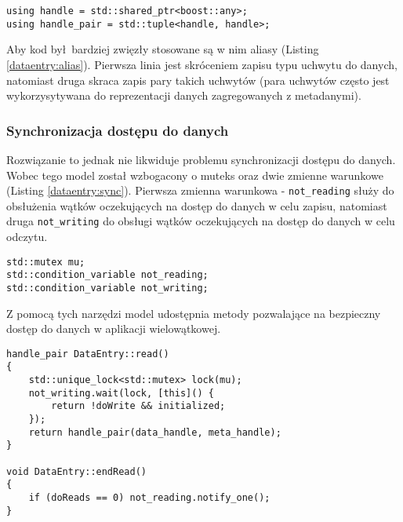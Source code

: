 \begin{minipage}{\textwidth}
	\begin{lstlisting}[label=dataentry:alias, caption={Aliasy używane w kodzie aplikacji},alsoletter={()[].=}]
using handle = std::shared_ptr<boost::any>;
using handle_pair = std::tuple<handle, handle>;
	\end{lstlisting}
\end{minipage}

Aby kod był bardziej zwięzły stosowane są w nim aliasy (Listing \ref{dataentry:alias}). Pierwsza linia jest skróceniem zapisu typu uchwytu do danych, natomiast druga skraca zapis pary takich uchwytów (para uchwytów często jest wykorzysytywana do reprezentacji danych zagregowanych z metadanymi).

\subsubsection{Synchronizacja dostępu do danych}
Rozwiązanie to jednak nie likwiduje problemu synchronizacji dostępu do danych. Wobec tego model został wzbogacony o muteks oraz dwie zmienne warunkowe (Listing \ref{dataentry:sync}). Pierwsza zmienna warunkowa - \lstinline$not_reading$ służy do obsłużenia wątków oczekujących na dostęp do danych w celu zapisu, natomiast druga \lstinline$not_writing$ do obsługi wątków oczekujących na dostęp do danych w celu odczytu.

\begin{minipage}{\textwidth}
	\begin{lstlisting}[label=dataentry:sync, caption={Składowe klasy \lstinline$DataEntry$ zapewniające bezpieczne użycie w środowisku wielowątkowym},alsoletter={()[].=}]
std::mutex mu;
std::condition_variable not_reading;
std::condition_variable not_writing;
	\end{lstlisting}
\end{minipage}

Z pomocą tych narzędzi model udostępnia metody pozwalające na bezpieczny dostęp do danych w aplikacji wielowątkowej.

\begin{minipage}{\textwidth}
	\begin{lstlisting}[label=dataentry:sync:read, caption={Metody klasy \lstinline$DataEntry$ zapewniające bezpieczny odczyt danych współdzielonych w środowisku wielowątkowym},alsoletter={()[].=}]
handle_pair DataEntry::read()
{
	std::unique_lock<std::mutex> lock(mu);
	not_writing.wait(lock, [this]() {
		return !doWrite && initialized;
	});
	return handle_pair(data_handle, meta_handle);
}

void DataEntry::endRead()
{
	if (doReads == 0) not_reading.notify_one();
}
	\end{lstlisting}
\end{minipage}


